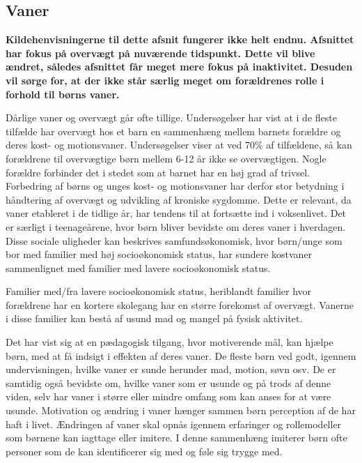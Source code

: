 \subsection{Vaner}
 {\color{red} \textbf{Kildehenvisningerne til dette afsnit fungerer ikke helt endnu.
Afsnittet har fokus på overvægt på nuværende tidspunkt. Dette vil blive ændret, således afsnittet får meget mere fokus på inaktivitet.
Desuden vil sørge for, at der ikke står særlig meget om forældrenes rolle i forhold til børns vaner.}}
 
Dårlige vaner og overvægt går ofte tillige. Undersøgelser har vist at i de fleste tilfælde har overvægt hos et barn en sammenhæng mellem barnets forældre og deres kost- og motionsvaner. Undersøgelser viser at ved 70\% af tilfældene, så kan forældrene til overvægtige børn mellem 6-12 år ikke se overvægtigen. Nogle forældre forbinder det i stedet som at barnet har en høj grad af trivsel.\citep{videnskab} 
Forbedring af børns og unges kost- og motionsvaner har derfor stor betydning i håndtering af overvægt og udvikling af kroniske sygdomme. Dette er relevant, da vaner etableret i de tidlige år, har tendens til at fortsætte ind i voksenlivet.\citep{trends}  Det er særligt i teenageårene, hvor børn bliver bevidste om deres vaner i hverdagen.\citep{dansker} 
Disse sociale uligheder kan beskrives samfundsøkonomisk, hvor børn/unge som bor med familier med høj socioøkonomisk status, har sundere kostvaner sammenlignet med familier med lavere socioøkonomisk status.\citep{trends} 

Familier med/fra lavere socioøkonomisk status, heriblandt familier hvor forældrene har en kortere skolegang har en større forekomst af overvægt. 
Vanerne i disse familier kan bestå af usund mad og mangel på fysisk aktivitet.

Det har vist sig at en pædagogisk tilgang, hvor motiverende mål, kan hjælpe børn, med at få indsigt i effekten af deres vaner. De fleste børn ved godt, igennem undervisningen, hvilke vaner er sunde herunder mad, motion, søvn osv. De er samtidig også bevidste om, hvilke vaner som er usunde og på trods af denne viden, selv har vaner i større eller mindre omfang som kan anses for at være usunde. 
Motivation og ændring i vaner hænger sammen børn perception af de har haft i livet. Ændringen af vaner skal opnås igennem erfaringer og rollemodeller som børnene kan iagttage eller imitere. I denne sammenhæng imiterer børn ofte personer som de kan identificerer sig med og føle sig trygge med.\citep{opsporing}
